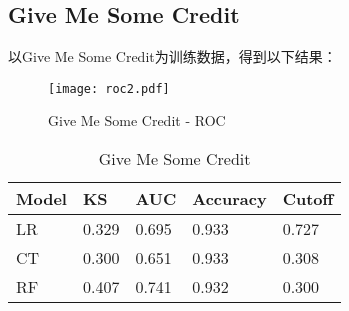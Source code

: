 \subsection{Give Me Some Credit}
以Give Me Some Credit为训练数据，得到以下结果：
\begin{figure}
\centering
\texttt{[image: roc2.pdf]}
\caption{\label{fig:roc2}Give Me Some Credit - ROC}
\end{figure}

\begin{table}[htbp]
  \centering
  \caption{Give Me Some Credit}
    \begin{tabular}{lllll}
    \toprule
    Model & KS  & AUC & Accuracy  & Cutoff \\
    \midrule
    LR & 0.329 & 0.695 & 0.933 & 0.727 \\
    CT & 0.300 & 0.651 & 0.933 & 0.308 \\
    RF & 0.407 & 0.741 & 0.932 & 0.300 \\
    \bottomrule
    \end{tabular}%
  \label{tab:roc2}%
\end{table}%
